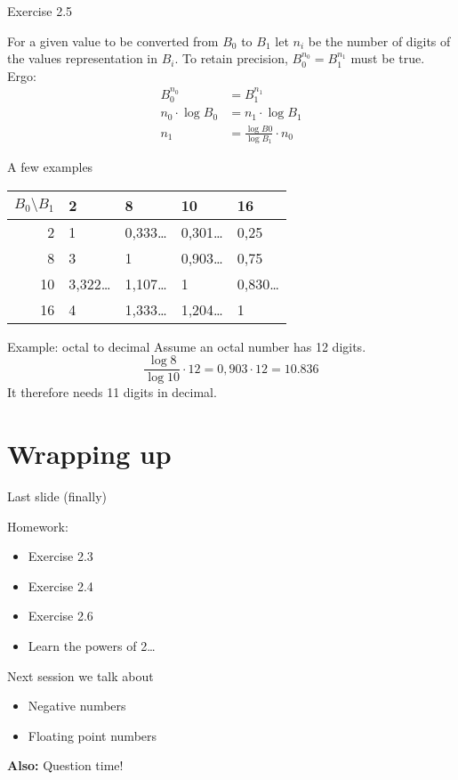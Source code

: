 \documentclass[11pt]{tudbeamer}
\begin{document}
\begin{frame}[allowframebreaks]{Exercise 2.5}

	For a given value to be converted from $B_0$ to $B_1$
	let $n_i$ be the number of digits of the values representation in $B_i$.
	To retain precision, $B^{n_0}_0 = B^{n_1}_1$ must be true. Ergo:
	\begin{align}
		B^{n_0}_0 &= B^{n_1}_1 \\
		n_0 \cdot \log B_0 &= n_1 \cdot \log B_1 \\
		n_1 &= \frac{\log B0}{\log B_1} \cdot n_0
	\end{align}

\framebreak

	\centering
	A few examples
	\vspace{1em}
	
	\begin{tabular}{r|llll}
		$B_0 \setminus B_1$ & 2 & 8 & 10 & 16 \\
		\hline
		2 	& 1 			& 0,333\dots	& 0,301\dots	& 0,25 \\
		8	& 3			& 1			& 0,903\dots	& 0,75 \\
		10	& 3,322\dots	& 1,107\dots	& 1			& 0,830\dots \\
		16	& 4			& 1,333\dots	& 1,204\dots	& 1 \\
	\end{tabular}

\framebreak
	
	\begin{block}{Example: octal to decimal}
		Assume an octal number has 12 digits.
		$$\frac{\log 8}{\log 10} \cdot 12 = 0,903 \cdot 12 = 10.836$$
		It therefore needs 11 digits in decimal.
	\end{block}

\end{frame}

\section{Wrapping up}

\begin{frame}{Last slide (finally)}

	Homework:
	\begin{itemize}
		\item Exercise 2.3
		\item Exercise 2.4
		\item Exercise 2.6
		\item Learn the powers of 2\dots
	\end{itemize}
	\vspace{1em}
	
	Next session we talk about
	\begin{itemize}
		\item Negative numbers
		\item Floating point numbers
	\end{itemize} 
	\vspace{1em}
	\textbf{Also:} Question time!

\end{frame}
\end{document}
